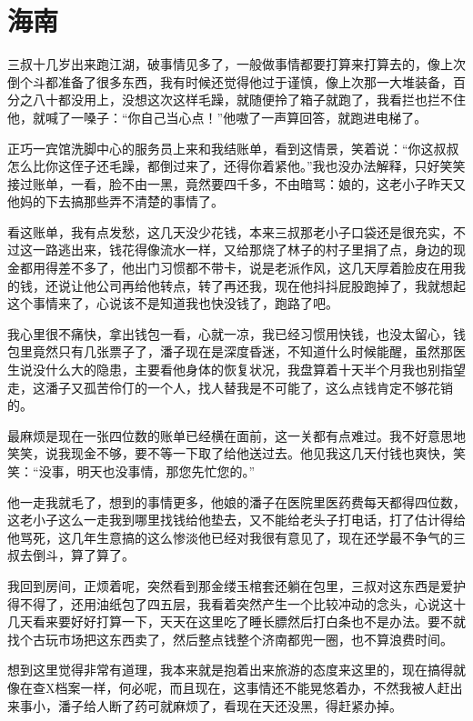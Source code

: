 \chapter{海南}

三叔十几岁出来跑江湖，破事情见多了，一般做事情都要打算来打算去的，像上次倒个斗都准备了很多东西，我有时候还觉得他过于谨慎，像上次那一大堆装备，百分之八十都没用上，没想这次这样毛躁，就随便拎了箱子就跑了，我看拦也拦不住他，就喊了一嗓子：“你自己当心点！”他嗷了一声算回答，就跑进电梯了。

正巧一宾馆洗脚中心的服务员上来和我结账单，看到这情景，笑着说：“你这叔叔怎么比你这侄子还毛躁，都倒过来了，还得你着紧他。”我也没办法解释，只好笑笑接过账单，一看，脸不由一黑，竟然要四千多，不由暗骂：娘的，这老小子昨天又他妈的下去搞那些弄不清楚的事情了。

看这账单，我有点发愁，这几天没少花钱，本来三叔那老小子口袋还是很充实，不过这一路逃出来，钱花得像流水一样，又给那烧了林子的村子里捐了点，身边的现金都用得差不多了，他出门习惯都不带卡，说是老派作风，这几天厚着脸皮在用我的钱，还说让他公司再给他转点，转了再还我，现在他抖抖屁股跑掉了，我就想起这个事情来了，心说该不是知道我也快没钱了，跑路了吧。

我心里很不痛快，拿出钱包一看，心就一凉，我已经习惯用快钱，也没太留心，钱包里竟然只有几张票子了，潘子现在是深度昏迷，不知道什么时候能醒，虽然那医生说没什么大的隐患，主要看他身体的恢复状况，我盘算着十天半个月我也别指望走，这潘子又孤苦伶仃的一个人，找人替我是不可能了，这么点钱肯定不够花销的。

最麻烦是现在一张四位数的账单已经横在面前，这一关都有点难过。我不好意思地笑笑，说我现金不够，要不等一下取了给他送过去。他见我这几天付钱也爽快，笑笑：“没事，明天也没事情，那您先忙您的。”

他一走我就毛了，想到的事情更多，他娘的潘子在医院里医药费每天都得四位数，这老小子这么一走我到哪里找钱给他垫去，又不能给老头子打电话，打了估计得给他骂死，这几年生意搞的这么惨淡他已经对我很有意见了，现在还学最不争气的三叔去倒斗，算了算了。

我回到房间，正烦着呢，突然看到那金缕玉棺套还躺在包里，三叔对这东西是爱护得不得了，还用油纸包了四五层，我看着突然产生一个比较冲动的念头，心说这十几天看来要好好打算一下，天天在这里吃了睡长膘然后打白条也不是办法。要不就找个古玩市场把这东西卖了，然后整点钱整个济南都兜一圈，也不算浪费时间。

想到这里觉得非常有道理，我本来就是抱着出来旅游的态度来这里的，现在搞得就像在查X档案一样，何必呢，而且现在，这事情还不能晃悠着办，不然我被人赶出来事小，潘子给人断了药可就麻烦了，看现在天还没黑，得赶紧办掉。

